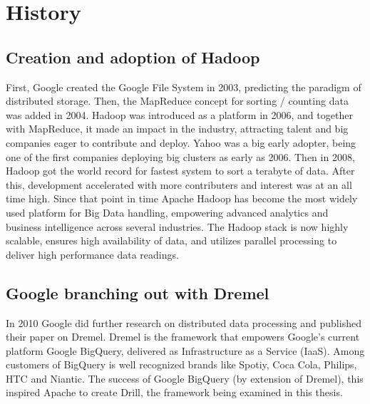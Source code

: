 \documentclass[a4paper,english]{report}
\begin{document}
		\section{History}
			\subsection{Creation and adoption of Hadoop}
			First, Google created the Google File System in 2003\cite{gfs}, predicting the paradigm of distributed storage. Then, the MapReduce concept for sorting / counting data was added in 2004\cite{mapredoriginal}. Hadoop was introduced as a platform in 2006\cite{hadoopguide}, and together with MapReduce, it made an impact in the industry, attracting talent and big companies eager to contribute and deploy. Yahoo was a big early adopter, being one of the first companies deploying big clusters as early as 2006\cite{hadoopguide}. Then in 2008, Hadoop got the world record for fastest system to sort a terabyte of data\cite{hadoopguide}. After this, development accelerated with more contributers and interest was at an all time high. Since that point in time Apache Hadoop has become the most widely used platform for Big Data handling, empowering advanced analytics and business intelligence across several industries. The Hadoop stack is now highly scalable, ensures high availability of data, and utilizes parallel processing to deliver high performance data readings.
			
			\subsection{Google branching out with Dremel}
			In 2010 Google did further research on distributed data processing and published their paper on Dremel\cite{dremel}. Dremel is the framework that empowers Google's current platform Google BigQuery, delivered as Infrastructure as a Service (IaaS). Among customers of BigQuery is well recognized brands like Spotiy, Coca Cola, Philips, HTC and Niantic\cite{dremelcustomers}. The success of Google BigQuery (by extension of Dremel), this inspired Apache to create Drill, the framework being examined in this thesis.
			
\end{document}
